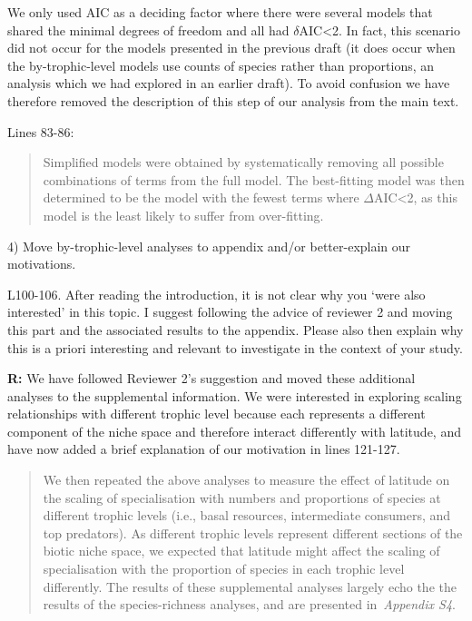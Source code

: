 \documentclass[12pt]{letter}
\newenvironment{refquote}{\bigskip \begin{it}}{\end{it}\smallskip}
\begin{document}
  We only used AIC as a deciding factor where
  there were several models that shared the minimal degrees 
  of freedom and all had $\delta$AIC\textless2. In fact, 
  this scenario did not occur for the models presented in 
  the previous draft (it does occur when the 
  by-trophic-level models use counts of species rather than
  proportions, an analysis which we had explored in an 
  earlier draft). To avoid confusion we have therefore 
  removed the description of this step of our analysis from 
  the main text. 


  Lines 83-86:  

  \begin{quotation}

    Simplified models were obtained by systematically 
    removing all possible combinations of terms from the 
    full model. The best-fitting model was then determined 
    to be the model with the fewest terms where 
    $\Delta$AIC\textless2, as this model is the least likely 
    to suffer from over-fitting. 

  \end{quotation}


  4) Move by-trophic-level analyses to appendix and/or better-explain our motivations.


  \begin{refquote}

    L100-106. After reading the introduction, it is not clear why you ‘were
    also interested’ in this topic. I suggest following the advice of reviewer
    2 and moving this part and the associated results to the appendix. Please
    also then explain why this is a priori interesting and relevant to
    investigate in the context of your study.

  \end{refquote}

  \textbf{R:} We have followed Reviewer 2's suggestion and 
  moved these additional analyses to the supplemental 
  information. We were interested in exploring scaling 
  relationships with different trophic level because each
  represents a different component of the niche space and 
  therefore interact differently with latitude, and have now
  added a brief explanation of our motivation in lines 
  121-127.


  \begin{quotation}

    We then repeated the above analyses to measure the 
    effect of latitude on the scaling of specialisation 
    with numbers and proportions of species at different 
    trophic levels (i.e., basal resources, intermediate 
    consumers, and top predators). As different trophic 
    levels represent different sections of the biotic niche 
    space, we expected that latitude might affect the 
    scaling of specialisation with the proportion of 
    species in each trophic level differently. The results
    of these supplemental analyses largely echo the the
    results of the species-richness analyses, and are 
    presented in~\emph{Appendix S4}.


  \end{quotation}
\end{document}
